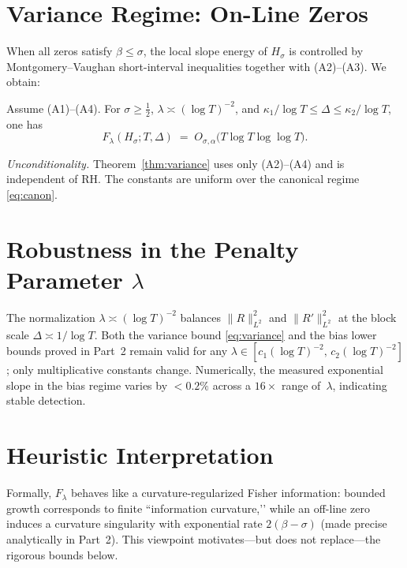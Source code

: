 \section{Variance Regime: On-Line Zeros}

When all zeros satisfy $\beta\le\sigma$, the local slope energy of $H_\sigma$ is controlled by
Montgomery–Vaughan short-interval inequalities together with (A2)–(A3).  We obtain:

\begin{theorem}\label{thm:variance}
Assume \textup{(A1)–(A4)}.  For $\sigma\ge\tfrac12$, $\lambda\asymp(\log T)^{-2}$, and
$\kappa_1/\log T \le \Delta \le \kappa_2/\log T$, one has
\begin{equation}
F_\lambda(H_\sigma;T,\Delta)
  \;=\; O_{\sigma,\alpha}\!\bigl(T\log T\log\log T\bigr).
\label{eq:variance}
\tag{1.3}
\end{equation}
\end{theorem}

\noindent
\emph{Unconditionality.}
Theorem~\ref{thm:variance} uses only (A2)–(A4) and is independent of RH.  The constants are
uniform over the canonical regime \eqref{eq:canon}.

\section{Robustness in the Penalty Parameter \texorpdfstring{$\lambda$}{lambda}}

The normalization $\lambda\asymp(\log T)^{-2}$ balances $\|R\|_{L^2}^2$ and $\|R'\|_{L^2}^2$
at the block scale $\Delta\asymp 1/\log T$.  Both the variance bound \eqref{eq:variance} and the
bias lower bounds proved in Part~2 remain valid for any
$\lambda\in[c_1(\log T)^{-2},\,c_2(\log T)^{-2}]$; only multiplicative constants change.
Numerically, the measured exponential slope in the bias regime varies by $<0.2\%$ across a
$16\times$ range of~$\lambda$, indicating stable detection.

\section{Heuristic Interpretation}

Formally, $F_\lambda$ behaves like a curvature-regularized Fisher information:
bounded growth corresponds to finite ``information curvature,’’ while an off-line zero induces a
curvature singularity with exponential rate $2(\beta-\sigma)$ (made precise analytically in Part~2).
This viewpoint motivates—but does not replace—the rigorous bounds below.

